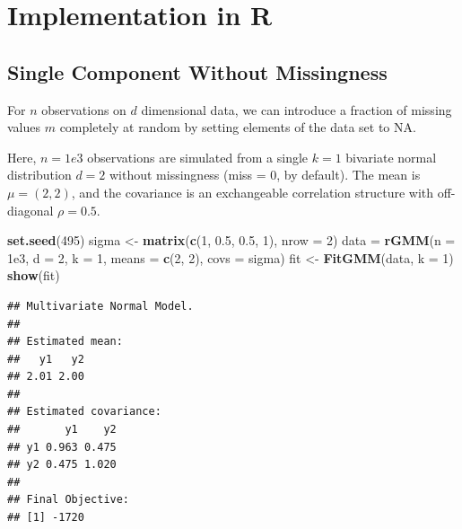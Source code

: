 \documentclass[12pt]{article}
\newenvironment{Shaded}{\begin{snugshade}}{\end{snugshade}}
\newcommand{\AttributeTok}[1]{\textcolor[rgb]{0.13,0.29,0.53}{#1}}
\newcommand{\DecValTok}[1]{\textcolor[rgb]{0.00,0.00,0.81}{#1}}
\newcommand{\FloatTok}[1]{\textcolor[rgb]{0.00,0.00,0.81}{#1}}
\newcommand{\FunctionTok}[1]{\textcolor[rgb]{0.13,0.29,0.53}{\textbf{#1}}}
\newcommand{\NormalTok}[1]{#1}
\newcommand{\OtherTok}[1]{\textcolor[rgb]{0.56,0.35,0.01}{#1}}
\begin{document}
\hypertarget{implementation-in-r}{%
\section{Implementation in R}\label{implementation-in-r}}

\hypertarget{single-component-without-missingness}{%
\subsection{Single Component Without
Missingness}\label{single-component-without-missingness}}

For \(n\) observations on \(d\) dimensional data, we can introduce a
fraction of missing values \(m\) completely at random by setting
elements of the data set to NA.

Here, \(n = 1e3\) observations are simulated from a single \(k = 1\)
bivariate normal distribution \(d = 2\) without missingness (miss = 0,
by default). The mean is \(\mu = (2, 2)\), and the covariance is an
exchangeable correlation structure with off-diagonal \(\rho = 0.5\).

\begin{Shaded}
\begin{Highlighting}[]
\FunctionTok{set.seed}\NormalTok{(}\DecValTok{495}\NormalTok{)}
\NormalTok{sigma }\OtherTok{\textless{}{-}} \FunctionTok{matrix}\NormalTok{(}\FunctionTok{c}\NormalTok{(}\DecValTok{1}\NormalTok{, }\FloatTok{0.5}\NormalTok{, }\FloatTok{0.5}\NormalTok{, }\DecValTok{1}\NormalTok{), }\AttributeTok{nrow =} \DecValTok{2}\NormalTok{)}
\NormalTok{data }\OtherTok{=} \FunctionTok{rGMM}\NormalTok{(}\AttributeTok{n =} \FloatTok{1e3}\NormalTok{, }\AttributeTok{d =} \DecValTok{2}\NormalTok{, }\AttributeTok{k =} \DecValTok{1}\NormalTok{, }\AttributeTok{means =} \FunctionTok{c}\NormalTok{(}\DecValTok{2}\NormalTok{, }\DecValTok{2}\NormalTok{), }\AttributeTok{covs =}\NormalTok{ sigma)}
\NormalTok{fit }\OtherTok{\textless{}{-}} \FunctionTok{FitGMM}\NormalTok{(data, }\AttributeTok{k =} \DecValTok{1}\NormalTok{)}
\FunctionTok{show}\NormalTok{(fit)}
\end{Highlighting}
\end{Shaded}

\begin{verbatim}
## Multivariate Normal Model. 
## 
## Estimated mean:
##   y1   y2 
## 2.01 2.00 
## 
## Estimated covariance:
##       y1    y2
## y1 0.963 0.475
## y2 0.475 1.020
## 
## Final Objective:
## [1] -1720
\end{verbatim}
\end{document}
